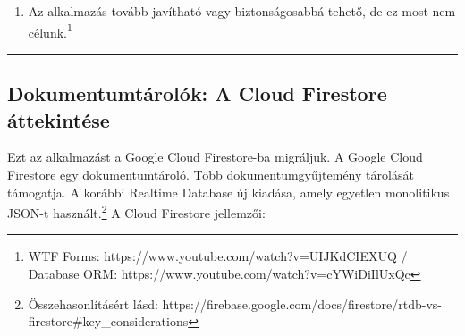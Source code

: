 \documentclass[
  magyar,
]{article}
\providecommand{\tightlist}{%
  \setlength{\itemsep}{0pt}\setlength{\parskip}{0pt}}
\begin{document}
\begin{enumerate}
  \begin{itemize}
  \tightlist
  \item
    \begin{enumerate}
    \def\labelenumii{\alph{enumii}.}
    \tightlist
    \item
      A \texttt{templates} mappa tartalmazza a jinja template engine
      által feldolgozott HTML lapokat. A Python változók elérhetők a
      HTML sablonokban
      (\texttt{\{\%\ for\ ...\ in\ /\ if\ ...else\ /\ with\ /\ block,\ extends\ \%\}}),
      és a sablonok egymásba ágyazhatók a `block'
      segítségével.\footnote{Flask app:
        https://www.youtube.com/watch?v=MwZwr5Tvyxo / HTML sablonok:
        https://www.youtube.com/watch?v=QnDWlZuWYW0}
    \end{enumerate}
  \item
    \begin{enumerate}
    \def\labelenumii{\alph{enumii}.}
    \setcounter{enumii}{1}
    \tightlist
    \item
      Bootstrap (formázáshoz)
    \end{enumerate}
  \end{itemize}
\item
  Az alkalmazás tovább javítható vagy biztonságosabbá tehető, de ez most
  nem célunk.\footnote{WTF Forms:
    https://www.youtube.com/watch?v=UIJKdCIEXUQ / Database ORM:
    https://www.youtube.com/watch?v=cYWiDiIlUxQc}
\end{enumerate}

\begin{center}\rule{0.5\linewidth}{0.5pt}\end{center}

\subsection{Dokumentumtárolók: A Cloud Firestore
áttekintése}\label{dokumentumtuxe1roluxf3k-a-cloud-firestore-uxe1ttekintuxe9se}

Ezt az alkalmazást a Google Cloud Firestore-ba migráljuk. A Google Cloud
Firestore egy dokumentumtároló. Több dokumentumgyűjtemény tárolását
támogatja. A korábbi Realtime Database új kiadása, amely egyetlen
monolitikus JSON-t használt.\footnote{Összehasonlításért lásd:
  https://firebase.google.com/docs/firestore/rtdb-vs-firestore\#key\_considerations}
A Cloud Firestore jellemzői:
\end{document}
